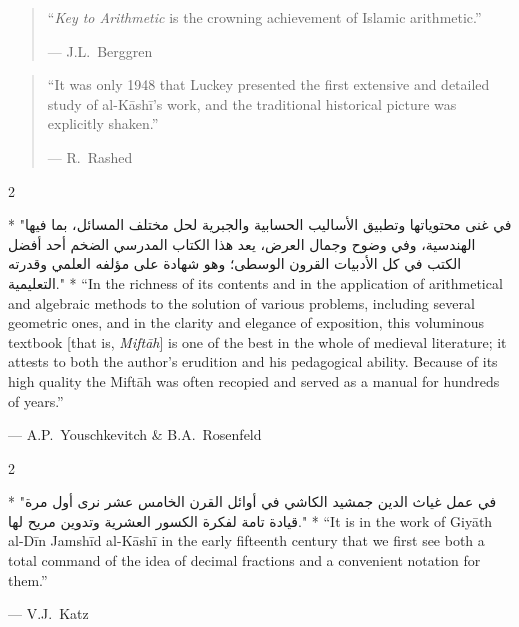 \documentclass[11pt,a4paper]{article}
\newcommand{\ar}[1]{\arabicfont\beginR #1\endR}
\newenvironment{bilingual}{%
  \vspace{0.3em}%
  \begin{paracol}{2}%
}{%
  \end{paracol}%
  \vspace{0.3em}%
}
\begin{document}
\begin{quote}
``\textit{Key to Arithmetic} is the crowning achievement of Islamic
arithmetic.''
\begin{flushright}
--- J.L.\ Berggren
\end{flushright}
\end{quote}

\vspace{0.3cm}

\begin{quote}
``It was only 1948 that Luckey presented the first extensive and
detailed study of al-K\=ash\=i's work, and the traditional historical
picture was explicitly shaken.''
\begin{flushright}
--- R.\ Rashed
\end{flushright}
\end{quote}

\vspace{0.3cm}

\begin{bilingual}
\switchcolumn[0]*
\ar{"في غنى محتوياتها وتطبيق الأساليب الحسابية والجبرية لحل مختلف المسائل، بما فيها الهندسية، وفي وضوح وجمال العرض، يعد هذا الكتاب المدرسي الضخم أحد أفضل الكتب في كل الأدبيات القرون الوسطى؛ وهو شهادة على مؤلفه العلمي وقدرته التعليمية."}
\switchcolumn[1]*
``In the richness of its contents and in the application of
arithmetical and algebraic methods to the solution of various
problems, including several geometric ones, and in the clarity and
elegance of exposition, this voluminous textbook [that is,
\textit{Mift\=ah}] is one of the best in the whole of medieval
literature; it attests to both the author's erudition and his
pedagogical ability. Because of its high quality the Mift\=ah was
often recopied and served as a manual for hundreds of years.''
\begin{flushright}
--- A.P.\ Youschkevitch \& B.A.\ Rosenfeld
\end{flushright}
\end{bilingual}

\vspace{0.3cm}

\begin{bilingual}
\switchcolumn[0]*
\ar{"في عمل غياث الدين جمشيد الكاشي في أوائل القرن الخامس عشر نرى أول مرة قيادة تامة لفكرة الكسور العشرية وتدوين مريح لها."}
\switchcolumn[1]*
``It is in the work of Giy\=ath al-D\=in Jamsh\=id al-K\=ash\=i in the early
fifteenth century that we first see both a total command of the idea
of decimal fractions and a convenient notation for them.''
\begin{flushright}
--- V.J.\ Katz
\end{flushright}
\end{bilingual}
\end{document}
